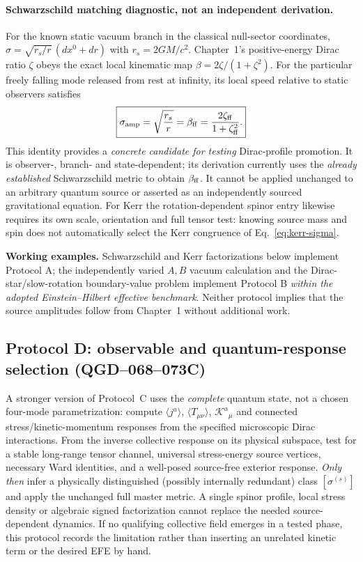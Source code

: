 \documentclass[11pt,a4paper]{article}
\begin{document}
\paragraph{Schwarzschild matching diagnostic, not an independent derivation.}
For the known static vacuum branch in the classical null-sector
coordinates, $\sigma=\sqrt{r_s/r}\,(dx^0+dr)$ with
$r_s=2GM/c^2$.  Chapter~1's positive-energy Dirac ratio $\zeta$
obeys the exact local kinematic map $\beta=2\zeta/(1+\zeta^2)$.
For the particular freely falling mode released from rest at infinity,
its local speed relative to static observers satisfies
\begin{equation}\label{eq:qgd065-beta-sigma}
\boxed{\displaystyle
\sigma_{\rm amp}=\sqrt{\frac{r_s}{r}}=
\beta_{\rm ff}=\frac{2\zeta_{\rm ff}}{1+\zeta_{\rm ff}^2}.}
\end{equation}
This identity provides a \emph{concrete candidate for testing}
Dirac-profile promotion.  It is observer-, branch- and state-dependent;
its derivation currently uses the \emph{already established}
Schwarzschild metric to obtain $\beta_{\rm ff}$.
It cannot be applied unchanged to an arbitrary quantum source or
asserted as an independently sourced gravitational equation.
For Kerr the rotation-dependent spinor entry likewise requires its own
scale, orientation and full tensor test: knowing source mass and spin does
not automatically select the Kerr congruence of
Eq.~\eqref{eq:kerr-sigma}.

\noindent\textbf{Working examples.} Schwarzschild and Kerr factorizations below implement Protocol A; the independently varied \(A,B\) vacuum calculation and the Dirac-star/slow-rotation boundary-value problem implement Protocol B \emph{within the adopted Einstein--Hilbert effective benchmark}. Neither protocol implies that the source amplitudes follow from Chapter~1 without additional work.


\subsection{Protocol D: observable and quantum-response selection (QGD--068--073C)}\label{sec:qgd075-response-protocol}
A stronger version of Protocol~C uses the \emph{complete} quantum state,
not a chosen four-mode parametrization: compute $\langle j^a\rangle$,
$\langle T_{\mu\nu}\rangle$, $\mathcal K^a{}_{\mu}$ and connected
stress/kinetic-momentum responses from the specified microscopic
Dirac interactions. From the inverse collective response on its physical
subspace, test for a stable long-range tensor channel, universal
stress-energy source vertices, necessary Ward identities, and a
well-posed source-free exterior response. \emph{Only then} infer a
physically distinguished (possibly internally redundant) class
$[\sigma^{(s)}]$ and apply the unchanged full master metric.
A single spinor profile, local stress density or algebraic signed
factorization cannot replace the needed source-dependent dynamics.
If no qualifying collective field emerges in a tested phase, this
protocol records the limitation rather than inserting an unrelated
kinetic term or the desired EFE by hand.
\end{document}
